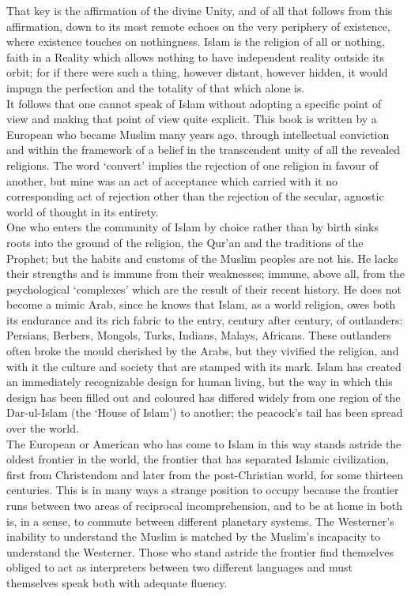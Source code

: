 \documentclass[10pt, twoside]{book}
\begin{document}
That key is the affirmation of the divine Unity, and of all that follows from this affirmation, down to its most remote echoes on the very periphery of existence, where existence touches on nothingness. Islam is the religion of all or nothing, faith in a Reality which allows nothing to have independent reality outside its orbit; for if there were such a thing, however distant, however hidden, it would impugn the perfection and the totality of that which alone is.\\

It follows that one cannot speak of Islam without adopting a specific point of view and making that point of view quite explicit. This book is written by a European who became Muslim many years ago, through intellectual conviction and within the framework of a belief in the transcendent unity of all the revealed religions. The word `convert' implies the rejection of one religion in favour of another, but mine was an act of acceptance which carried with it no corresponding act of rejection other than the rejection of the secular, agnostic world of thought in its entirety. \\

One who enters the community of Islam by choice rather than by birth sinks roots into the ground of the religion, the Qur'an and the traditions of the Prophet; but the habits and customs of the Muslim peoples are not his. He lacks their strengths and is immune from their weaknesses; immune, above all, from the psychological `complexes' which are the result of their recent history. He does not become a mimic Arab, since he knows that Islam, as a world religion, owes both its endurance and its rich fabric to the entry, century after century, of outlanders: Persians, Berbers, Mongols, Turks, Indians, Malays, Africans. These outlanders often broke the mould cherished by the Arabs, but they vivified the religion, and with it the culture and society that are stamped with its mark. Islam has created an immediately recognizable design for human living, but the way in which this design has been filled out and coloured has differed widely from one region of the Dar\hyp{}ul\hyp{}Islam (the `House of Islam') to another; the peacock's tail has been spread over the world. \\

The European or American who has come to Islam in this way stands astride the oldest frontier in the world, the frontier that has separated Islamic civilization, first from Christendom and later from the post\hyp{}Christian world, for some thirteen centuries. This is in many ways a strange position to occupy because the frontier runs between two areas of reciprocal incomprehension, and to be at home in both is, in a sense, to commute between different planetary systems. The Westerner's inability to understand the Muslim is matched by the Muslim's incapacity to understand the Westerner. Those who stand astride the frontier find themselves obliged to act as interpreters between two different languages and must themselves speak both with adequate fluency. \\
\end{document}
